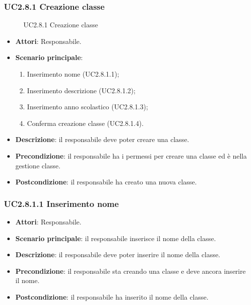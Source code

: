 \subsubsection{UC2.8.1 Creazione classe}
\begin{figure}[H]
\centering
\noindent{}
\caption{UC2.8.1 Creazione classe}
\end{figure}
\begin{itemize}
\item \textbf{Attori}: Responsabile.
\item \textbf{Scenario principale}:
\begin{enumerate}
\item Inserimento nome (UC2.8.1.1);
\item Inserimento descrizione (UC2.8.1.2);
\item Inserimento anno scolastico (UC2.8.1.3);
\item Conferma creazione classe (UC2.8.1.4).
\end{enumerate}
\item \textbf{Descrizione}: il responsabile deve poter creare una classe.
\item \textbf{Precondizione}: il responsabile ha i permessi per creare una classe ed è nella gestione classe.
\item \textbf{Postcondizione}: il responsabile ha creato una nuova classe.
\end{itemize}
\subsubsection{UC2.8.1.1 Inserimento nome}
\begin{itemize}
\item \textbf{Attori}: Responsabile.
\item \textbf{Scenario principale}: il responsabile inserisce il nome della classe.
\item \textbf{Descrizione}: il responsabile deve poter inserire il nome della classe.
\item \textbf{Precondizione}: il responsabile sta creando una classe e deve ancora inserire il nome.
\item \textbf{Postcondizione}: il responsabile ha inserito il nome della classe.
\end{itemize}
